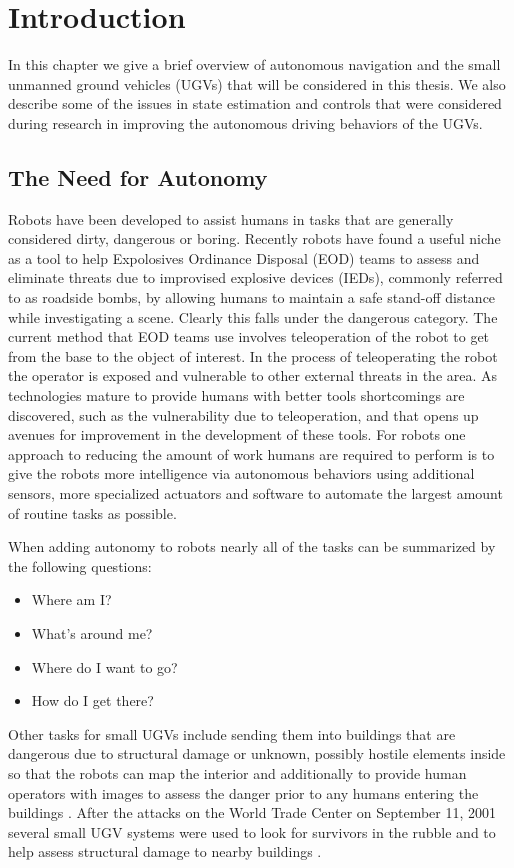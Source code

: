 \chapter{Introduction}
\label{ch:introduction}
In this chapter we give a brief overview of autonomous navigation and the small unmanned ground vehicles (UGVs) that will be considered in this thesis. We also describe some of the issues in state estimation and controls that were considered during research in improving the autonomous driving behaviors of the UGVs.

\section{The Need for Autonomy}
Robots have been developed to assist humans in tasks that are generally considered dirty, dangerous or boring. Recently robots have found a useful niche as a tool to help Expolosives Ordinance Disposal (EOD) teams to assess and eliminate threats due to improvised explosive devices (IEDs), commonly referred to as roadside bombs, by allowing humans to maintain a safe stand-off distance while investigating a scene. Clearly this falls under the dangerous category. The current method that EOD teams use involves teleoperation of the robot to get from the base to the object of interest. In the process of teleoperating the robot the operator is exposed and vulnerable to other external threats in the area. As technologies mature to provide humans with better tools shortcomings are discovered, such as the vulnerability due to teleoperation, and that opens up avenues for improvement in the development of these tools. For robots one approach to reducing the amount of work humans are required to perform is to give the robots more intelligence via autonomous behaviors using additional sensors, more specialized actuators and software to automate the largest amount of routine tasks as possible.

When adding autonomy to robots nearly all of the tasks can be summarized by the following questions:
\begin{itemize}
\item Where am I?
\item What's around me?
\item Where do I want to go?
\item How do I get there?
\end{itemize}

Other tasks for small UGVs include sending them into buildings that are dangerous due to structural damage or unknown, possibly hostile elements inside so that the robots can map the interior and additionally to provide human operators with images to assess the danger prior to any humans entering the buildings \cite{CongressUGV06}. After the attacks on the World Trade Center on September 11, 2001 several small UGV systems were used to look for survivors in the rubble and to help assess structural damage to nearby buildings \cite{Everett02}.


